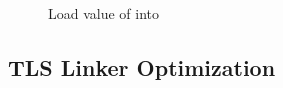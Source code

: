 \begin{description}
\item[]
  Load value of  into 

\begin{table}[H]
\Hrule
\caption{Local Exec Model Code Sequence, III}
\begin{center}
\small{}
\end{center}
\Hrule
\end{table}

\end{description}

\subsection{TLS Linker Optimization}

